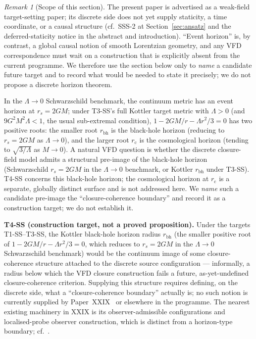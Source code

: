 \documentclass[12pt]{article}
\theoremstyle{definition}
\theoremstyle{remark}
\newtheorem{remark}[theorem]{Remark}
\begin{document}
\begin{remark}[Scope of this section]
The present paper is advertised as a weak-field target-setting paper; its discrete side does not yet supply staticity, a time coordinate, or a causal structure (cf.\ SSS-2 at Section~\ref{sec:ansatz} and the deferred-staticity notice in the abstract and introduction). ``Event horizon'' is, by contrast, a global causal notion of smooth Lorentzian geometry, and any VFD correspondence must wait on a construction that is explicitly absent from the current programme. We therefore use the section below only to \emph{name} a candidate future target and to record what would be needed to state it precisely; we do not propose a discrete horizon theorem.
\end{remark}


In the $\Lambda \to 0$ Schwarzschild benchmark, the continuum metric has an event horizon at $r_s = 2GM$; under T3-SS's full Kottler target metric with $\Lambda > 0$ (and $9 G^2 M^2 \Lambda < 1$, the usual sub-extremal condition), $1 - 2GM/r - \Lambda r^2/3 = 0$ has two positive roots: the smaller root $r_{\mathrm{bh}}$ is the black-hole horizon (reducing to $r_s = 2GM$ as $\Lambda \to 0$), and the larger root $r_{\mathrm{c}}$ is the cosmological horizon (tending to $\sqrt{3/\Lambda}$ as $M \to 0$). A natural VFD question is whether the discrete closure-field model admits a structural pre-image of the black-hole horizon (Schwarzschild $r_s = 2GM$ in the $\Lambda \to 0$ benchmark, or Kottler $r_{\mathrm{bh}}$ under T3-SS). T4-SS concerns this black-hole horizon; the cosmological horizon at $r_{\mathrm{c}}$ is a separate, globally distinct surface and is not addressed here. We \emph{name} such a candidate pre-image the ``closure-coherence boundary'' and record it as a construction target; we do not establish it.

\textbf{T4-SS (construction target, not a proved proposition).} Under the targets T1-SS--T3-SS, the Kottler black-hole horizon radius $r_{\mathrm{bh}}$ (the smaller positive root of $1 - 2GM/r - \Lambda r^2/3 = 0$, which reduces to $r_s = 2GM$ in the $\Lambda \to 0$ Schwarzschild benchmark) would be the continuum image of some closure-coherence structure attached to the discrete source configuration --- informally, a radius below which the VFD closure construction fails a future, as-yet-undefined closure-coherence criterion. Supplying this structure requires defining, on the discrete side, what a ``closure-coherence boundary'' actually is; no such notion is currently supplied by Paper~XXIX~\citep{SmartXXIX} or elsewhere in the programme. The nearest existing machinery in XXIX is its observer-admissible configurations and localised-probe observer construction, which is distinct from a horizon-type boundary; cf.~\citep{SmartXXIX}.
\end{document}

